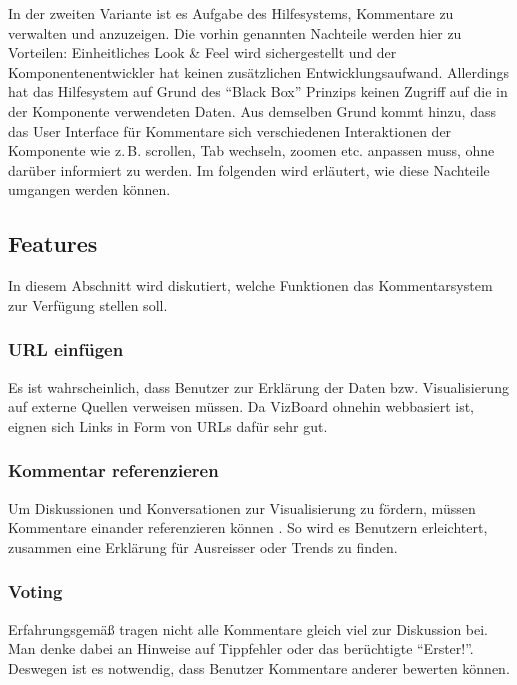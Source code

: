 \documentclass[
	headsepline,
	footsepline,
	fontsize=12pt,
	bibliography=totoc
]{scrbook}
\begin{document}
In der zweiten Variante ist es Aufgabe des Hilfesystems, Kommentare zu verwalten und anzuzeigen. Die vorhin genannten Nachteile werden hier zu Vorteilen: Einheitliches Look \& Feel wird sichergestellt und der Komponentenentwickler hat keinen zusätzlichen Entwicklungsaufwand. Allerdings hat das Hilfesystem auf Grund des \enquote{Black Box} Prinzips keinen Zugriff auf die in der Komponente verwendeten Daten. Aus demselben Grund kommt hinzu, dass das User Interface für Kommentare sich verschiedenen Interaktionen der Komponente wie z.\,B. scrollen, Tab wechseln, zoomen etc. anpassen muss, ohne darüber informiert zu werden. Im folgenden wird erläutert, wie diese Nachteile umgangen werden können.

\subsection{Features}
\label{section:konzeption:kommentare:features}


In diesem Abschnitt wird diskutiert, welche Funktionen das Kommentarsystem zur Verfügung stellen soll.

\subsubsection{URL einfügen}

Es ist wahrscheinlich, dass Benutzer zur Erklärung der Daten bzw. Visualisierung auf externe Quellen verweisen müssen. Da VizBoard ohnehin webbasiert ist, eignen sich Links in Form von URLs dafür sehr gut.

\subsubsection{Kommentar referenzieren}

Um Diskussionen und Konversationen zur Visualisierung zu fördern, müssen Kommentare einander referenzieren können \cite{Heer2007}. So wird es Benutzern erleichtert, zusammen eine Erklärung für Ausreisser oder Trends zu finden. 

\subsubsection{Voting}

Erfahrungsgemäß tragen nicht alle Kommentare gleich viel zur Diskussion bei. Man denke dabei an Hinweise auf Tippfehler oder das berüchtigte \enquote{Erster!}. Deswegen ist es notwendig, dass Benutzer Kommentare anderer bewerten können.
\end{document}
